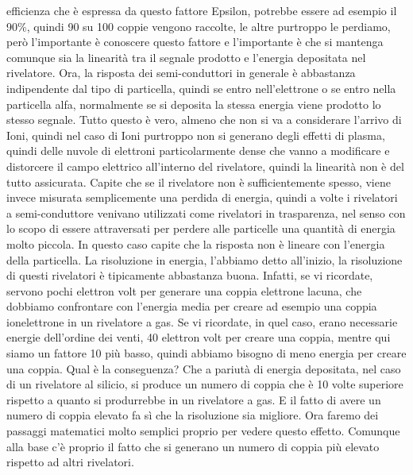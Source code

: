 {efficienza che è espressa da questo fattore Epsilon, potrebbe essere ad esempio il 90\%, quindi 90 su 100 coppie vengono raccolte, le altre purtroppo le perdiamo, però l'importante è conoscere questo fattore e l'importante è che si mantenga comunque sia la linearità tra il segnale prodotto e l'energia depositata nel rivelatore. Ora, la risposta dei semi-conduttori in generale è abbastanza indipendente dal tipo di particella, quindi se entro nell'elettrone o se entro nella particella alfa, normalmente se si deposita la stessa energia viene prodotto lo stesso segnale. Tutto questo è vero, almeno che non si va a considerare l'arrivo di Ioni, quindi nel caso di Ioni purtroppo non si generano degli effetti di plasma, quindi delle nuvole di elettroni particolarmente dense che vanno a modificare e distorcere il campo elettrico all'interno del rivelatore, quindi la linearità non è del tutto assicurata. Capite che se il rivelatore non è sufficientemente spesso, viene invece misurata semplicemente una perdida di energia, quindi a volte i rivelatori a semi-conduttore venivano utilizzati come rivelatori in trasparenza, nel senso con lo scopo di essere attraversati per perdere alle particelle una quantità di energia molto piccola. In questo caso capite che la risposta non è lineare con l'energia della particella. La risoluzione in energia, l'abbiamo detto all'inizio, la risoluzione di questi rivelatori è tipicamente abbastanza buona. Infatti, se vi ricordate, servono pochi elettron volt per generare una coppia elettrone lacuna, che dobbiamo confrontare con l'energia media per creare ad esempio una coppia ionelettrone in un rivelatore a gas. Se vi ricordate, in quel caso, erano necessarie energie dell'ordine dei venti, 40 elettron volt per creare una coppia, mentre qui siamo un fattore 10 più basso, quindi abbiamo bisogno di meno energia per creare una coppia. Qual è la conseguenza? Che a pariutà di energia depositata, nel caso di un rivelatore al silicio, si produce un numero di coppia che è 10 volte superiore rispetto a quanto si produrrebbe in un rivelatore a gas. E il fatto di avere un numero di coppia elevato fa sì che la risoluzione sia migliore. Ora faremo dei passaggi matematici molto semplici proprio per vedere questo effetto. Comunque alla base c'è proprio il fatto che si generano un numero di coppia più elevato rispetto ad altri rivelatori.

}
